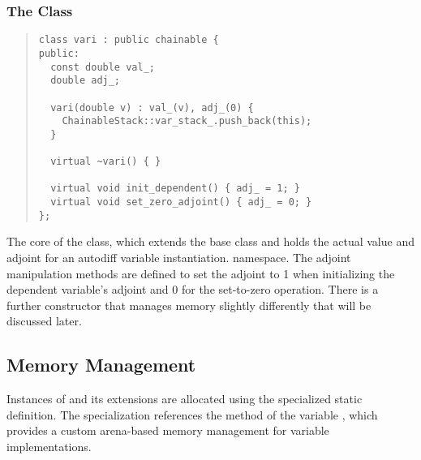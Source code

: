 \documentclass[10pt]{article}
\begin{document}
\subsubsection{The  Class}

\begin{quote}
\begin{Verbatim}
class vari : public chainable {
public:
  const double val_;
  double adj_;

  vari(double v) : val_(v), adj_(0) { 
    ChainableStack::var_stack_.push_back(this);
  }

  virtual ~vari() { }

  virtual void init_dependent() { adj_ = 1; }
  virtual void set_zero_adjoint() { adj_ = 0; }
};
\end{Verbatim}
\end{quote}
%
The core of the  class, which extends the base class
 and holds the actual value and adjoint for an
autodiff variable instantiation.  namespace.  The adjoint manipulation
methods are defined to set the adjoint to 1 when initializing the
dependent variable's adjoint and 0 for the set-to-zero
operation. There is a further constructor that manages memory slightly
differently that will be discussed
later.


\subsection{Memory Management}

Instances of  and its extensions are allocated using the
specialized static ~ definition.  The specialization
references the  method of the variable
, which provides a custom arena-based
memory management for variable implementations.
\end{document}
